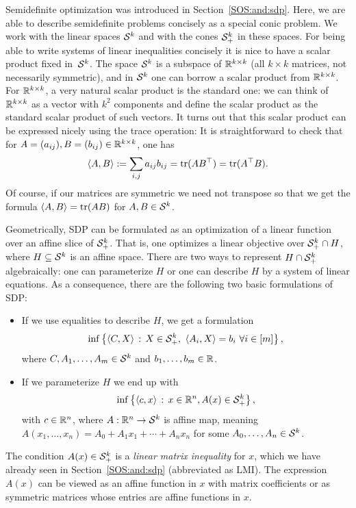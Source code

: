Semidefinite optimization was introduced in Section~\ref{SOS:and:sdp}. Here, we are able to describe semidefinite problems concisely as a special conic problem. We work with the linear spaces $\mathcal{S}^k$ and with the cones $\mathcal{S}_+^k$ in these spaces. For being able to write systems of linear inequalities concisely it is nice to have a scalar product fixed in~$\mathcal{S}^k$. The space $\mathcal{S}^k$ is a subspace of $\mathbb{R}^{k \times k}$ (all $k \times k$ matrices, not necessarily symmetric), and in $\mathcal{S}^k$ one can borrow a scalar product from $\mathbb{R}^{k \times k}$. For $\mathbb{R}^{k \times k}$, a very natural scalar product is the standard one: we can think of $\mathbb{R}^{k \times k}$ as a vector with $k^2$ components and define the scalar product as the standard scalar product of such vectors. It turns out that this scalar product can be expressed nicely using the trace operation: It is straightforward to check that for $A = (a_{ij}), B= (b_{ij}) \in \mathbb{R}^{k \times k}$, one has 
\[
	\left\langle A , B \right\rangle:= \sum_{i,j} a_{ij} b_{ij} = \operatorname{tr}(A B^\top) = \operatorname{tr}(A^\top B).
\] Of course, if our matrices are symmetric we need not transpose so that we get the formula $\left\langle A , B \right\rangle = \operatorname{tr}(A B)$ for $A, B \in \mathcal{S}^k$. 


Geometrically, SDP can be formulated as an optimization of a linear function over an affine slice of $\mathcal{S}_+^k$. That is, one optimizes a linear objective over $\mathcal{S}_+^k \cap H$, where $H \subseteq \mathcal{S}^k$ is an affine space. There are two ways to represent $H \cap \mathcal{S}_+^k$ algebraically: one can parameterize $H$ or one can describe $H$ by a system of linear equations. As a consequence, there are the following two basic formulations of SDP:

\begin{itemize}
 \item If we use equalities to describe $H$, we get a formulation
\[
	\inf \left\{  \left\langle C , X \right\rangle  \,:\,  X \in \mathcal{S}_+^k, \ \left\langle A_i , X \right\rangle = b_i \ \forall i \in [m] \right\},
\]
where $C, A_1,\ldots,A_m \in \mathcal{S}^k$ and $b_1,\ldots,b_m \in \mathbb{R}$.

 \item If we parameterize $H$ we end up with 
\[
	\inf \left\{  \left\langle c , x \right\rangle \,:\, x \in \mathbb{R}^n, A(x) \in \mathcal{S}_+^k \right\},
\]
with $c \in \mathbb{R}^n$, where $A : \mathbb{R}^n \to \mathcal{S}^k$ is affine map, meaning  $A(x_1,\ldots,x_n) = A_0 + A_1 x_1 + \cdots + A_n x_n$ for some $A_0,\ldots,A_n \in \mathcal{S}^k$. 
\end{itemize}
%
The condition $A(x) \in \mathcal{S}_+^k$ is a \emph{linear matrix inequality} for $x$, which we have already seen in Section~\ref{SOS:and:sdp}
(abbreviated as LMI). The expression $A(x)$ can be viewed as an affine function in $x$ with matrix coefficients or as symmetric matrices whose entries are affine functions in $x$.


